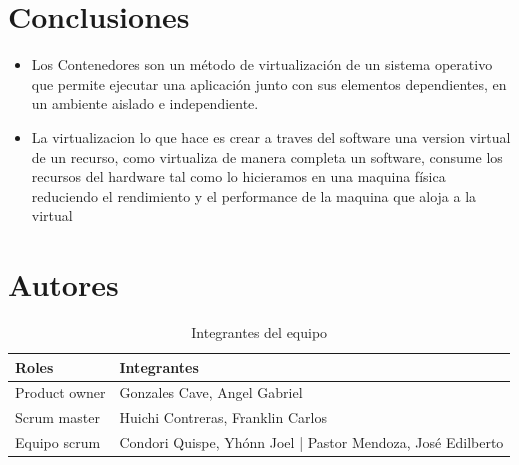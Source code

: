 \documentclass[preprint,12pt]{elsarticle}
\begin{document}

\section{Conclusiones}\label{sec:6}


\begin{itemize}
	\item Los Contenedores son un método de virtualización de un sistema operativo que permite ejecutar una aplicación junto con sus elementos dependientes, en un ambiente aislado e independiente.
	\item La virtualizacion lo que hace es crear a traves del software una version virtual de un recurso, como virtualiza de manera completa un software, consume los recursos del hardware tal como lo hicieramos en una maquina física reduciendo el rendimiento y el performance de la maquina que aloja a la virtual
\end{itemize}




\section{Autores}

\begin{table}[htbp]
\begin{center}
\begin{tabular}{|l|l|}
\hline
Roles & Integrantes \\
\hline \hline
Product owner & Gonzales Cave, Angel Gabriel \\ \hline
Scrum master & Huichi Contreras, Franklin Carlos  \\ \hline
Equipo scrum & Condori Quispe, Yhónn Joel | Pastor Mendoza, José Edilberto \\ \hline
\end{tabular}
\caption{Integrantes del equipo}
\label{tabla:sencilla}
\end{center}
\end{table}
\end{document}
